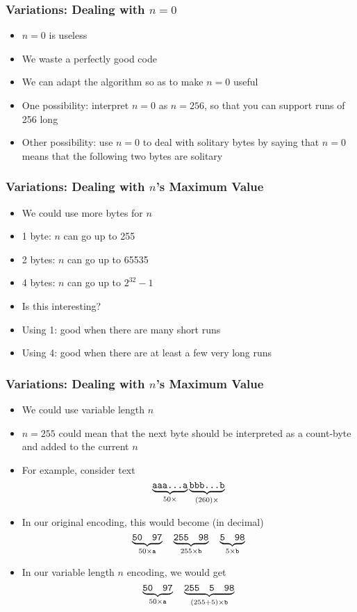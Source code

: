 \begin{frame}
  \frametitle{Variations: Dealing with $n = 0$}
  \begin{itemize}
    \item $n = 0$ is useless
    \item We waste a perfectly good code
    \item We can adapt the algorithm so as to make $n = 0$ useful
    \item One possibility: interpret $n = 0$ as $n = 256$, so that
          you can support runs of 256 long
    \item Other possibility: use $n = 0$ to deal with solitary bytes by
          saying that $n = 0$ means that the following two bytes are solitary
  \end{itemize}
\end{frame}

\begin{frame}
  \frametitle{Variations: Dealing with $n$'s Maximum Value}
  \begin{itemize}
    \item We could use more bytes for $n$
    \item 1 byte: $n$ can go up to 255
    \item 2 bytes: $n$ can go up to 65535
    \item 4 bytes: $n$ can go up to $2^{32}-1$
    \item Is this interesting?
    \item Using 1: good
          when there are many short runs
    \item Using 4: good
          when there are at least a few very long runs
  \end{itemize}
\end{frame}

\begin{frame}
  \frametitle{Variations: Dealing with $n$'s Maximum Value}
  \begin{itemize}
    \item We could use variable length $n$
    \item $n = 255$ could mean that the next byte should be interpreted as a count-byte and added to the current $n$
    \item For example, consider text
          \[
            \underbrace{\texttt{aaa\dots a}}_{50\times}\underbrace{\texttt{bbb\dots b}}_{(260)\times}
          \]
    \item In our original encoding, this would become (in decimal)
          \[
            \underbrace{\tt 50 \quad 97}_{50\times\tt a} \quad \underbrace{\tt 255 \quad 98}_{255\times\tt b} \quad \underbrace{\tt 5 \quad 98}_{5\times\tt b}
          \]
    \item In our variable length $n$ encoding, we would get
          \[
            \underbrace{\tt 50 \quad 97}_{50\times\tt a} \quad \underbrace{\tt 255 \quad 5 \quad 98}_{(255+5)\times\tt b}
          \]
  \end{itemize}
\end{frame}

